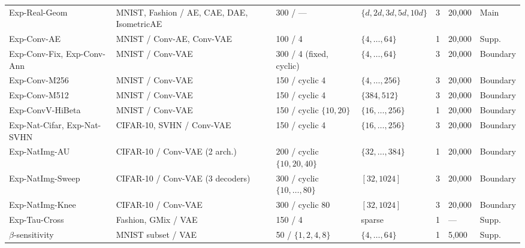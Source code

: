 \documentclass[11pt,a4paper]{jsarticle}
\begin{document}
\begin{table}[H]
\begin{tabular}{p{3.0cm}p{2.9cm}p{2.2cm}p{2.9cm}cp{1.2cm}p{1.5cm}}
Exp-Real-Geom & MNIST, Fashion / AE, CAE, DAE, IsometricAE & 300 / --- & $\{d,2d,3d,5d,10d\}$ & 3 & 20,000 & Main \\
Exp-Conv-AE & MNIST / Conv-AE, Conv-VAE & 100 / 4 & $\{4,\ldots,64\}$ & 1 & 20,000 & Supp. \\
Exp-Conv-Fix, Exp-Conv-Ann & MNIST / Conv-VAE & 300 / 4 (fixed, cyclic) & $\{4,\ldots,64\}$ & 3 & 20,000 & Boundary \\
Exp-Conv-M256 & MNIST / Conv-VAE & 150 / cyclic 4 & $\{4,\ldots,256\}$ & 3 & 20,000 & Boundary \\
Exp-Conv-M512 & MNIST / Conv-VAE & 150 / cyclic 4 & $\{384,512\}$ & 3 & 20,000 & Boundary \\
Exp-ConvV-HiBeta & MNIST / Conv-VAE & 150 / cyclic $\{10,20\}$ & $\{16,\ldots,256\}$ & 1 & 20,000 & Boundary \\
Exp-Nat-Cifar, Exp-Nat-SVHN & CIFAR-10, SVHN / Conv-VAE & 150 / cyclic 4 & $\{16,\ldots,256\}$ & 3 & 20,000 & Boundary \\
Exp-NatImg-AU & CIFAR-10 / Conv-VAE (2 arch.) & 200 / cyclic $\{10,20,40\}$ & $\{32,\ldots,384\}$ & 1 & 20,000 & Boundary \\
Exp-NatImg-Sweep & CIFAR-10 / Conv-VAE (3 decoders) & 300 / cyclic $\{10,\ldots,80\}$ & $[32,1024]$ & 3 & 20,000 & Boundary \\
Exp-NatImg-Knee & CIFAR-10 / Conv-VAE & 300 / cyclic 80 & $[32,1024]$ & 3 & 20,000 & Boundary \\
Exp-Tau-Cross & Fashion, GMix / VAE & 150 / 4 & sparse & 1 & --- & Supp. \\
$\beta$-sensitivity & MNIST subset / VAE & 50 / $\{1,2,4,8\}$ & $\{4,\ldots,64\}$ & 1 & 5,000 & Supp. \\
\bottomrule
\end{tabular}
\end{table}

\end{document}
